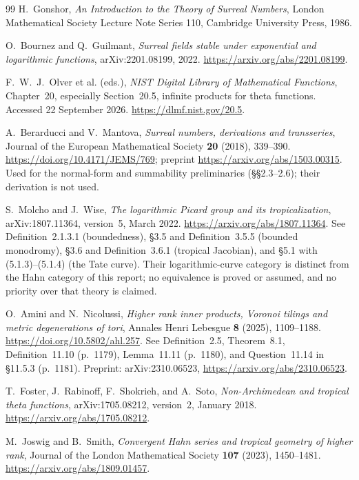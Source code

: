 \documentclass[11pt,letterpaper]{article}
\theoremstyle{definition}
\begin{document}
\begin{thebibliography}{99}
H.~Gonshor,
\emph{An Introduction to the Theory of Surreal Numbers},
London Mathematical Society Lecture Note Series 110,
Cambridge University Press, 1986.

O.~Bournez and Q.~Guilmant,
\emph{Surreal fields stable under exponential and logarithmic
functions}, arXiv:2201.08199, 2022.
\url{https://arxiv.org/abs/2201.08199}.

F.~W.~J.~Olver et al. (eds.),
\emph{NIST Digital Library of Mathematical Functions},
Chapter~20, especially Section~20.5, infinite products for theta
functions. Accessed 22 September 2026.
\url{https://dlmf.nist.gov/20.5}.

A.~Berarducci and V.~Mantova,
\emph{Surreal numbers, derivations and transseries},
Journal of the European Mathematical Society \textbf{20} (2018), 339--390.
\url{https://doi.org/10.4171/JEMS/769}; preprint
\url{https://arxiv.org/abs/1503.00315}. Used for the normal-form and
summability preliminaries (\S\S2.3--2.6); their derivation is not used.

S.~Molcho and J.~Wise,
\emph{The logarithmic Picard group and its tropicalization},
arXiv:1807.11364, version~5, March 2022.
\url{https://arxiv.org/abs/1807.11364}.
See Definition~2.1.3.1 (boundedness), \S3.5 and Definition~3.5.5
(bounded monodromy), \S3.6 and Definition~3.6.1 (tropical Jacobian), and
\S5.1 with (5.1.3)--(5.1.4) (the Tate curve). Their logarithmic-curve
category is distinct from the Hahn category of this report; no equivalence
is proved or assumed, and no priority over that theory is claimed.

O.~Amini and N.~Nicolussi,
\emph{Higher rank inner products, Voronoi tilings and metric degenerations
of tori}, Annales Henri Lebesgue \textbf{8} (2025), 1109--1188.
\url{https://doi.org/10.5802/ahl.257}. See Definition~2.5, Theorem~8.1,
Definition~11.10 (p.~1179), Lemma~11.11 (p.~1180), and Question~11.14 in
\S11.5.3 (p.~1181). Preprint: arXiv:2310.06523,
\url{https://arxiv.org/abs/2310.06523}.

T.~Foster, J.~Rabinoff, F.~Shokrieh, and A.~Soto,
\emph{Non-Archimedean and tropical theta functions},
arXiv:1705.08212, version~2, January 2018.
\url{https://arxiv.org/abs/1705.08212}.

M.~Joswig and B.~Smith,
\emph{Convergent Hahn series and tropical geometry of higher rank},
Journal of the London Mathematical Society \textbf{107} (2023), 1450--1481.
\url{https://arxiv.org/abs/1809.01457}.


\end{thebibliography}
\end{document}
